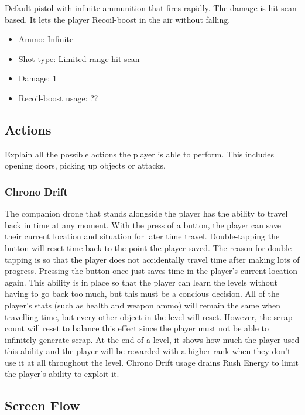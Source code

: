 \documentclass[12pt]{article}
\begin{document}
Default pistol with infinite ammunition that fires rapidly. The damage is hit-scan based. It lets the player Recoil-boost in the air without falling.

\begin{itemize}
	\item Ammo: Infinite
	\item Shot type: Limited range hit-scan
	\item Damage: 1
	\item Recoil-boost usage: ??
\end{itemize}

\subsection{Actions}

Explain all the possible actions the player is able to perform. This includes opening doors, picking up objects or attacks.

\subsubsection{Chrono Drift}

The companion drone that stands alongside the player has the ability to travel back in time at any moment. With the press of a button, the player can save their current location and situation for later time travel. Double-tapping the button will reset time back to the point the player saved. The reason for double tapping is so that the player does not accidentally travel time after making lots of progress. Pressing the button once just saves time in the player's current location again. This ability is in place so that the player can learn the levels without having to go back too much, but this must be a concious decision. All of the player's stats (such as health and weapon ammo) will remain the same when travelling time, but every other object in the level will reset. However, the scrap count will reset to balance this effect since the player must not be able to infinitely generate scrap. At the end of a level, it shows how much the player used this ability and the player will be rewarded with a higher rank when they don't use it at all throughout the level. Chrono Drift usage drains Rush Energy to limit the player's ability to exploit it.

\subsection{Screen Flow}
\end{document}
